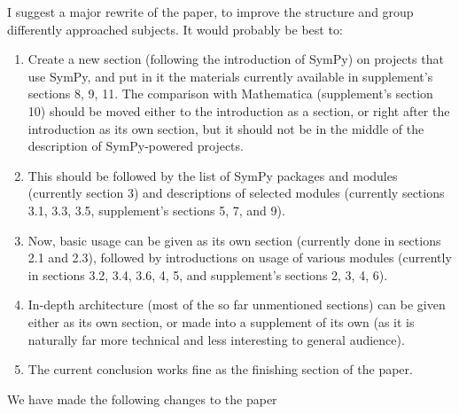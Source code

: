 \documentclass[answers,12pt]{exam}
\begin{document}
\begin{questions}
I suggest a major rewrite of the paper, to improve the structure and group differently approached subjects. It would probably be best to:
\begin{enumerate}
\item Create a new section (following the introduction of SymPy) on projects that use SymPy, and put in it the materials currently available in supplement's sections 8, 9, 11. The comparison with Mathematica (supplement's section 10) should be moved either to the introduction as a section, or right after the introduction as its own section, but it should not be in the middle of the description of SymPy-powered projects.
\item  This should be followed by the list of SymPy packages and modules (currently section 3) and descriptions of selected modules (currently sections 3.1, 3.3, 3.5, supplement's sections 5, 7, and 9).
\item Now, basic usage can be given as its own section (currently done in sections 2.1 and 2.3), followed by introductions on usage of various modules (currently in sections 3.2, 3.4, 3.6, 4, 5, and supplement's sections 2, 3, 4, 6).
\item In-depth architecture (most of the so far unmentioned sections) can be given either as its own section, or made into a supplement of its own (as it is naturally far more technical and less interesting to general audience).
\item The current conclusion works fine as the finishing section of the paper.
\end{enumerate}
\begin{solution}
  We have made the following changes to the paper


\end{solution}
\end{questions}
\end{document}
